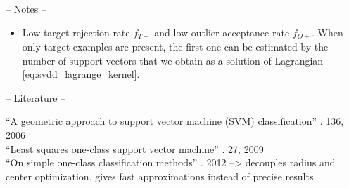 


-- Notes --
\begin{itemize}
  \item Low target rejection rate $f_{T-}$ and low outlier acceptance rate $f_{O+}$. When only target examples are present, the first one can be estimated by the number of support vectors that we obtain as a solution of Lagrangian \ref{eq:svdd_lagrange_kernel}.
\end{itemize}

-- Literature --


``A geometric approach to support vector machine (SVM) classification'' \cite{mavroforakis2006geometric}. 136, 2006 \\

``Least squares one-class support vector machine'' \cite{choi2009least}. 27, 2009 \\

``On simple one-class classification methods'' \cite{noumir2012simple}. 2012  --> decouples radius and center optimization, gives fast approximations instead of precise results. \\